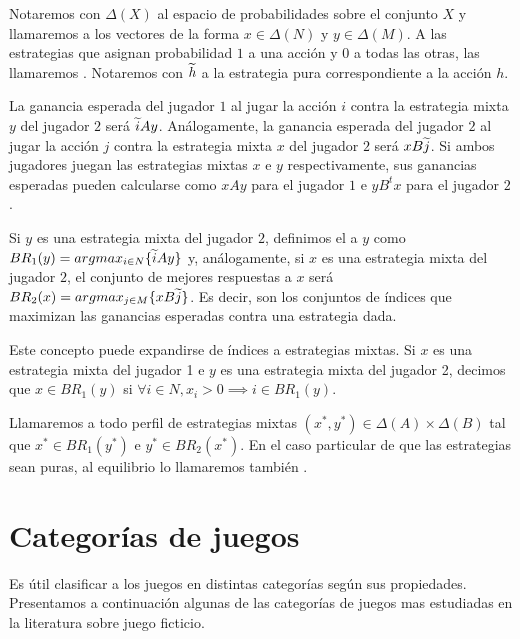 

Notaremos con $\Delta(X)$ al espacio de probabilidades sobre el conjunto $X$ y llamaremos  a los vectores de la forma $x \in \Delta(N)$ y $y \in \Delta(M)$. A las estrategias que asignan probabilidad $1$ a una acción y $0$ a todas las otras, las llamaremos . Notaremos con $\widetilde{h}$ a la estrategia pura correspondiente a la acción $h$.

La ganancia esperada del jugador $1$ al jugar la acción $i$ contra la estrategia mixta $y$ del jugador $2$ será $\widetilde{i}Ay$. Análogamente, la ganancia esperada del jugador $2$ al jugar la acción $j$ contra la estrategia mixta $x$ del jugador $2$ será $xB\widetilde{j}$. Si ambos jugadores juegan las estrategias mixtas $x$ e $y$ respectivamente, sus ganancias esperadas pueden calcularse como $xAy$ para el jugador $1$ e $yB^tx$ para el jugador $2$.

Si $y$ es una estrategia mixta del jugador $2$, definimos el  a $y$ como $BR_1(y) = argmax_{i \in N}\{\widetilde{i}Ay\}$ y, análogamente, si $x$ es una estrategia mixta del jugador $2$, el conjunto de mejores respuestas a $x$ será $BR_2(x) = argmax_{j \in M}\{xB\widetilde{j}\}$. Es decir, son los conjuntos de índices que maximizan las ganancias esperadas contra una estrategia dada.

Este concepto puede expandirse de índices a estrategias mixtas. Si $x$ es una estrategia mixta del jugador 1 e $y$ es una estrategia mixta del jugador 2, decimos que $x \in BR_1(y)$ si $\forall i \in N, x_i > 0 \implies i \in BR_1(y)$.

Llamaremos  a todo perfil de estrategias mixtas $(x^*, y^*) \in \Delta(A) \times \Delta(B)$ tal que $x^* \in BR_1(y^*)$ e $y^* \in BR_2(x^*)$. En el caso particular de que las estrategias sean puras, al equilibrio lo llamaremos también .

\section{Categorías de juegos}

Es útil clasificar a los juegos en distintas categorías según sus propiedades. Presentamos a continuación algunas de las categorías de juegos mas estudiadas en la literatura sobre juego ficticio.

